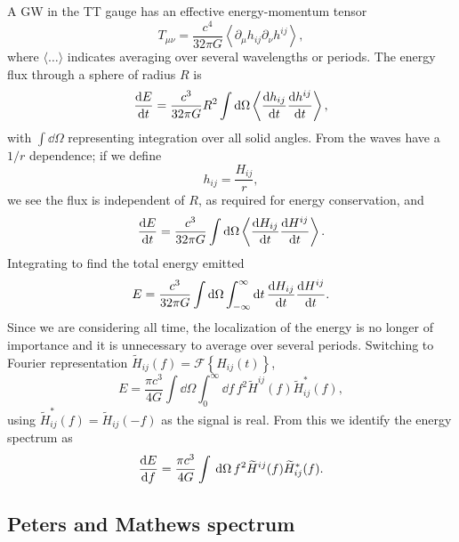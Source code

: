 A GW in the TT gauge has an effective energy-momentum tensor \citep[section 35.15]{Misner1973}
\begin{equation}
T_{\mu\nu} = \frac{c^4}{32\pi G}\left\langle\partial_\mu h_{ij} \partial_\nu h^{ij}\right\rangle,
\end{equation}
where $\langle\ldots\rangle$ indicates averaging over several wavelengths or periods. The energy flux through a sphere of radius $R$ is
\begin{equation}
\diff{E}{t} = \frac{c^3}{32\pi G} R^2 \int{\dd\Omega}\left\langle\diff{h_{ij}}{t}\diff{h^{ij}}{t}\right\rangle,
\end{equation}
with $\int{\dd\Omega}$ representing integration over all solid angles. From  the waves have a $1/{r}$ dependence; if we define
\begin{equation}
h_{ij} = \frac{H_{ij}}{r},
\end{equation}
we see the flux is independent of $R$, as required for energy conservation, and
\begin{equation}
\diff{E}{t} = \frac{c^3}{32\pi G} \int{\dd\Omega}\left\langle\diff{H_{ij}}{t}\diff{H^{ij}}{t}\right\rangle.
\end{equation}
Integrating to find the total energy emitted
\begin{equation}
E = \frac{c^3}{32\pi G} \int{\dd\Omega}\int_{-\infty}^{\infty}{\dd t} \, \diff{H_{ij}}{t}\diff{H^{ij}}{t}.
\label{eq:integrate_E}
\end{equation}
Since we are considering all time, the localization of the energy is no longer of importance and it is unnecessary to average over several periods. Switching to Fourier representation $\widetilde{H}_{ij}(f) = \mathscr{F}\left\{H_{ij}(t)\right\}$,
\begin{equation}
E = \frac{\pi c^3}{4 G} \int{\dd\Omega}\int_{0}^{\infty}{\dd f} \, f^2 \widetilde{H}^{ij}(f)\widetilde{H}_{ij}^*(f),
\label{eq:total_E}
\end{equation}
using $\widetilde{H}_{ij}^*(f) = \widetilde{H}_{ij}(-f)$ as the signal is real. From this we identify the energy spectrum as
\begin{align}
\diff{E}{f} = \frac{\pi c^3}{4 G} \intd{}{}{}{\Omega} \, f^2 \widetilde{H}^{ij}(f)\widetilde{H}_{ij}^*(f).
\label{eq:NK_dEdf}
\end{align}

\subsection{Peters and Mathews spectrum}

